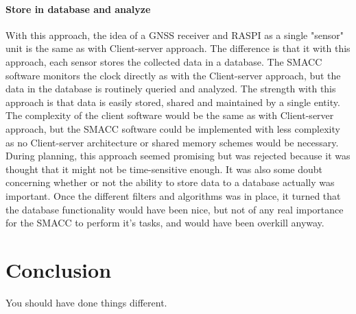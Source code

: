 \documentclass[12pt,english,a4paper]{report}
\begin{document}
\subsubsection{Store in database and analyze}
With this approach, the idea of a GNSS receiver and RASPI as a single "sensor" unit is the same as with Client-server approach. The difference is that it with this approach, each sensor stores the collected data in a database. The SMACC software monitors the clock directly as with the Client-server approach, but the data in the database is routinely queried and analyzed. The strength with this approach is that data is easily stored, shared and maintained by a single entity. The complexity of the client software would be the same as with Client-server approach, but the SMACC software could be implemented with less complexity as no Client-server architecture or shared memory schemes would be necessary. During planning, this approach seemed promising but was rejected because it was thought that it might not be time-sensitive enough. It was also some doubt concerning whether or not the ability to store data to a database actually was important. Once the different filters and algorithms was in place, it turned that the database functionality would have been nice, but not of any real importance for the SMACC to perform it's tasks, and would have been overkill anyway.

\chapter{Conclusion}
You should have done things different.




\newpage
\printbibliography[title={Complete Bibliography},heading=bibintoc]
\end{document}
